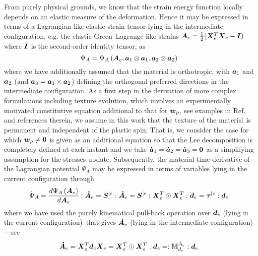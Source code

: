 \documentclass[preprint,review,12pt,sort&compress]{elsarticle}%
\renewcommand{\mathbf}[1]{\mbox{\boldmath $#1$ \unboldmath}  \!\!}
\begin{document}
From purely physical grounds, we know that the strain energy function locally
depends on an elastic measure of the deformation. Hence it may be expressed in
terms of a Lagrangian-like elastic strain tensor lying in the intermediate
configuration, e.g. the elastic Green--Lagrange-like strains $\mathbf{A}%
_{e}=\frac{1}{2}(\mathbf{X}_{e}^{T}\mathbf{X}_{e}-\mathbf{I})$ where
$\mathbf{I}$ is the second-order identity tensor, as%
\begin{equation}
\Psi_{A}=\Psi_{A}\left(  \mathbf{A}_{e},\mathbf{a}_{1}\otimes\mathbf{a}%
_{1},\mathbf{a}_{2}\otimes\mathbf{a}_{2}\right)  \label{Psi(Ae)}%
\end{equation}
where we have additionally assumed that the material is orthotropic, with
$\mathbf{a}_{1}$ and $\mathbf{a}_{2}$ (and $\mathbf{a}_{3}=\mathbf{a}%
_{1}\times\mathbf{a}_{2}$) defining the orthogonal preferred directions in the
intermediate configuration. As a first step in the derivation of more complex
formulations including texture evolution, which involves an experimentally
motivated constitutive equation additional to that for $\mathbf{w}_{p}$, see
examples in Ref. \cite{KimMontansBathe09} and references therein, we assume in
this work that the texture of the material is permanent and independent of the
plastic spin. That is, we consider the case for which $\mathbf{w}_{p}%
\neq\mathbf{0}$ is given as an additional equation so that the Lee
decomposition is completely defined at each instant and we take $\mathbf{\dot
{a}}_{1}=\mathbf{\dot{a}}_{2}=\mathbf{\dot{a}}_{3}=\mathbf{0}$ as a
simplifying assumption for the stresses update. Subsequently, the material
time derivative of the Lagrangian potential $\Psi_{A}$ may be expressed in
terms of variables lying in the current configuration through%
\begin{equation}
\dot{\Psi}_{A}=\frac{d\Psi_{A}\left(  \mathbf{A}_{e}\right)  }{d\mathbf{A}%
_{e}}:\mathbf{\dot{A}}_{e}=\mathbf{S}^{|e}:\mathbf{\dot{A}}_{e}=\mathbf{S}%
^{|e}:\mathbf{X}_{e}^{T}\odot\mathbf{X}_{e}^{T}:\mathbf{d}_{e}=\mathbf{\tau
}^{|e}:\mathbf{d}_{e} \label{Psidot Aedot de}%
\end{equation}
where we have used the purely kinematical pull-back operation over
$\mathbf{d}_{e}$ (lying in the current configuration)\ that gives
$\mathbf{\dot{A}}_{e}$ (lying in the intermediate configuration) ---see
\cite{LatMonAPM2016}%
\begin{equation}
\mathbf{\dot{A}}_{e}=\mathbf{X}_{e}^{T}\mathbf{d}_{e}\mathbf{X}_{e}%
=\mathbf{X}_{e}^{T}\odot\mathbf{X}_{e}^{T}:\mathbf{d}_{e}=:\mathbb{M}_{d_{e}%
}^{\dot{A}_{e}}:\mathbf{d}_{e}%
\end{equation}
\end{document}

